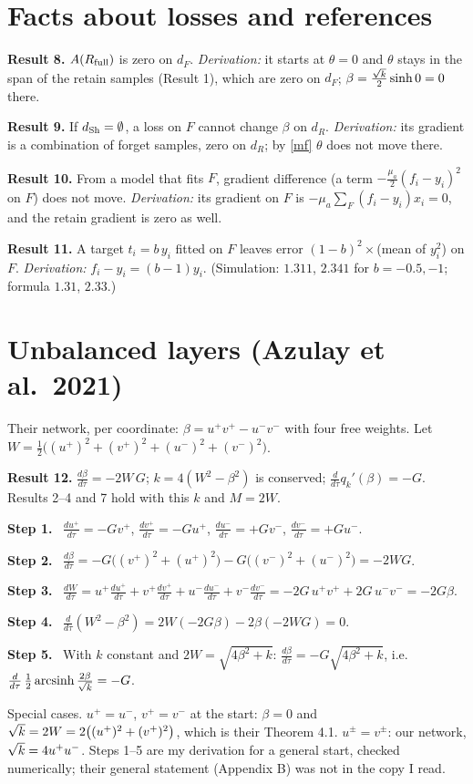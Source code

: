 \documentclass[10pt]{article}
\newcommand{\Rf}{R_{\rm full}}\newcommand{\Ff}{F_{\rm full}}\newcommand{\dSh}{d_{\rm Sh}}
\newcommand{\step}[1]{\par\smallskip\textbf{Step #1.}\ }
\begin{document}
\section{Facts about losses and references}
\textbf{Result 8.} $A(\Rf)$ is zero on $d_F$. \emph{Derivation:} it starts at $\theta=0$ and $\theta$ stays in the span of the retain samples (Result 1), which are zero on $d_F$; $\beta=\frac{\sqrt k}2\sinh0=0$ there.

\textbf{Result 9.} If $\dSh=\emptyset$, a loss on $F$ cannot change $\beta$ on $d_R$. \emph{Derivation:} its gradient is a combination of forget samples, zero on $d_R$; by \eqref{mf} $\theta$ does not move there.

\textbf{Result 10.} From a model that fits $F$, gradient difference (a term $-\frac{\mu_a}2(f_i-y_i)^2$ on $F$) does not move. \emph{Derivation:} its gradient on $F$ is $-\mu_a\sum_F(f_i-y_i)x_i=0$, and the retain gradient is zero as well.

\textbf{Result 11.} A target $t_i=b\,y_i$ fitted on $F$ leaves error $(1-b)^2\times$(mean of $y_i^2$) on $F$. \emph{Derivation:} $f_i-y_i=(b-1)y_i$. (Simulation: $1.311$, $2.341$ for $b=-0.5,-1$; formula $1.31$, $2.33$.)

\section{Unbalanced layers (Azulay et al.\ 2021)}
Their network, per coordinate: $\beta=u^+v^+-u^-v^-$ with four free weights. Let $W=\frac12\big((u^+)^2+(v^+)^2+(u^-)^2+(v^-)^2\big)$.

\textbf{Result 12.} $\frac{d\beta}{d\tau}=-2W\,G$; $k=4(W^2-\beta^2)$ is conserved; $\frac d{d\tau}q_k'(\beta)=-G$. Results 2--4 and 7 hold with this $k$ and $M=2W$.
\step1 $\frac{du^+}{d\tau}=-Gv^+$, $\frac{dv^+}{d\tau}=-Gu^+$, $\frac{du^-}{d\tau}=+Gv^-$, $\frac{dv^-}{d\tau}=+Gu^-$.
\step2 $\frac{d\beta}{d\tau}=-G\big((v^+)^2+(u^+)^2\big)-G\big((v^-)^2+(u^-)^2\big)=-2WG$.
\step3 $\frac{dW}{d\tau}=u^+\frac{du^+}{d\tau}+v^+\frac{dv^+}{d\tau}+u^-\frac{du^-}{d\tau}+v^-\frac{dv^-}{d\tau}=-2G\,u^+v^++2G\,u^-v^-=-2G\beta$.
\step4 $\frac d{d\tau}(W^2-\beta^2)=2W(-2G\beta)-2\beta(-2WG)=0$.
\step5 With $k$ constant and $2W=\sqrt{4\beta^2+k}$: $\frac{d\beta}{d\tau}=-G\sqrt{4\beta^2+k}$, i.e.\ $\frac d{d\tau}\,\frac12\operatorname{arcsinh}\frac{2\beta}{\sqrt k}=-G$.

Special cases. $u^+=u^-$, $v^+=v^-$ at the start: $\beta=0$ and $\sqrt k=2W=2\big((u^+)^2+(v^+)^2\big)$, which is their Theorem 4.1. $u^\pm=v^\pm$: our network, $\sqrt k=4u^+u^-$. Steps 1--5 are my derivation for a general start, checked numerically; their general statement (Appendix B) was not in the copy I read.
\end{document}
